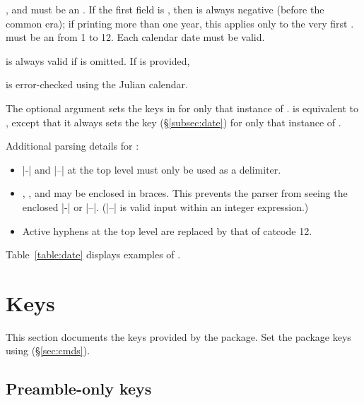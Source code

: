 \documentclass{beerydoc}
\begin{document}
\begin{codedoc}{\calendardate, \Calendardate}
   and  must be an .
  If the first field is , then  is always negative
  (before the common era); if printing more than one year, this applies only to
  the very first .
   must be an  from \num{1} to \num{12}.
  Each calendar date must be valid.
  \date{2-29} is always valid if  is omitted.
  If  is provided, \date{2-29} is error-checked using the Julian
  calendar.

  The optional argument sets the  keys in 
  for only that instance of .
   is equivalent to , except that it always
  sets the key  (\S\ref{subsec:date}) for only that
  instance of .

  Additional parsing details for :
  \begin{itemize}
    \item |-| and |--| at the top level must only be used as a delimiter.
    \item
    , , and  may be enclosed in braces.
    This prevents the parser from seeing the enclosed |-| or |--|.
    (|--| is valid input within an integer expression.)
    \item Active hyphens at the top level are replaced by that of catcode 12.
  \end{itemize}

  Table~\ref{table:date} displays examples of .
\end{codedoc}




\section{Keys}
\label{sec:keys}

This section documents the keys provided by the  package.
Set the package keys using  (\S\ref{sec:cmds}).

\subsection{Preamble-only keys}
\label{subsec:preamblekeys}
\end{document}
